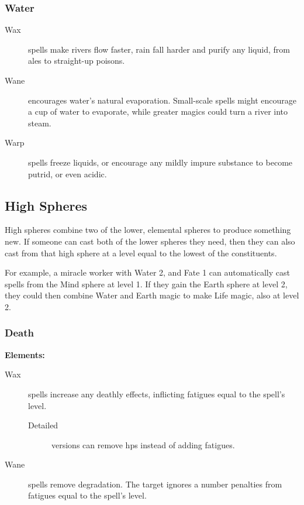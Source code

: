 \begin{multicols}{2}
\subsubsection{Water}

\begin{description}
  \item[Wax]
  spells make rivers flow faster, rain fall harder and purify any liquid, from ales to straight-up poisons.
  \item[Wane]
  encourages water's natural evaporation.
  Small-scale spells might encourage a cup of water to evaporate, while greater magics could turn a river into steam.
  \item[Warp]
  spells freeze liquids, or encourage any mildly impure substance to become putrid, or even acidic.
\end{description}

\subsection{High Spheres}

High spheres combine two of the lower, elemental spheres to produce something new.
If someone can cast both of the lower spheres they need, then they can also cast from that high sphere at a level equal to the lowest of the constituents.

\begin{exampletext}
  For example, a miracle worker with Water 2, and Fate 1 can automatically cast spells from the Mind sphere at level 1.
  If they gain the Earth sphere at level 2, they could then combine Water and Earth magic to make Life magic, also at level 2.
\end{exampletext}

\subsubsection{Death}

\textbf{Elements:}

\begin{description}
  \item[Wax]
  spells increase any deathly effects, inflicting \glspl{fatigue} equal to the spell's level.
    \begin{description}
      \item[Detailed]
        versions can remove \glspl{hp} instead of adding \glspl{fatigue}.
    \end{description}
  \item[Wane]
    spells remove degradation.
    The target ignores a number penalties from \glspl{fatigue} equal to the spell's level.


\end{description}
\end{multicols}
